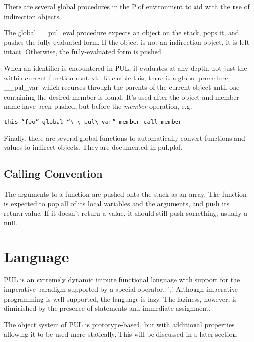 There are several global procedures in the Plof environment to aid with the use of indirection objects.

The global \_\_pul\_eval procedure expects an object on the stack, pops it, and pushes the fully-evaluated form. If the object is not an indirection object, it is left intact. Otherwise, the fully-evaluated form is pushed.

When an identifier is encountered in PUL, it evaluates at any depth, not just the within current function context. To enable this, there is a global procedure, \_\_pul\_var, which recurses through the parents of the current object until one containing the desired member is found. It's used after the object and member name have been pushed, but before the \textit{member} operation, e.g.

\begin{verbatim}
this “foo” global “\_\_pul\_var” member call member
\end{verbatim}

Finally, there are several global functions to automatically convert functions and values to indirect objects. They are documented in pul.plof.



\subsection{Calling Convention}

The arguments to a function are pushed onto the stack as an array. The function is expected to pop all of its local variables and the arguments, and push its return value. If it doesn't return a value, it should still push something, usually a null.



\section{Language}

PUL is an extremely dynamic impure functional language with support for the imperative paradigm supported by a special operator, ';'. Although imperative programming is well-supported, the language is lazy. The laziness, however, is diminished by the presence of statements and immediate assignment.

The object system of PUL is prototype-based, but with additional properties allowing it to be used more statically. This will be discussed in a later section.



